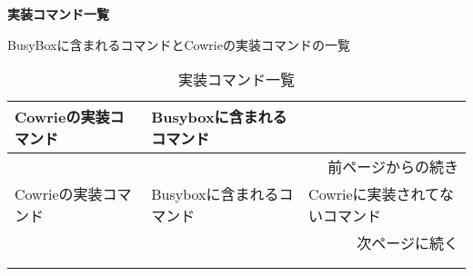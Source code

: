  
\begin{center}
\large{\textbf{実装コマンド一覧}}
\end{center}

BusyBoxに含まれるコマンドとCowrieの実装コマンドの一覧
 
\begin{longtable}{llp{64mm}}
  \caption{実装コマンド一覧}
  \label{table:command} \\
  \hline
  Cowrieの実装コマンド　& Busyboxに含まれるコマンド \\ \hline\hline
  \endfirsthead
  \multicolumn{3}{r}{前ページからの続き} \\ \hline
  Cowrieの実装コマンド　& Busyboxに含まれるコマンド & Cowrieに実装されてないコマンド\\ \hline\hline
  \endhead
  \hline
  \multicolumn{3}{r}{次ページに続く} \\
  \endfoot
  \hline
  \multicolumn{3}{r}{以上} \\
  \endlastfoot


\end{longtable}
